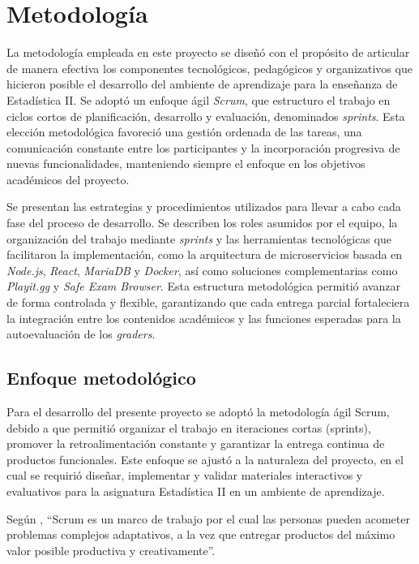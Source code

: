 \documentclass[letter,oneside,12pt,spanish]{report}
\begin{document}
\newpage

\chapter{Metodología}

La metodología empleada en este proyecto se diseñó con el propósito de articular de manera efectiva los componentes tecnológicos, pedagógicos y organizativos que hicieron posible el desarrollo del ambiente de aprendizaje para la enseñanza de Estadística II. Se adoptó un enfoque ágil \textit{Scrum}, que estructuro el trabajo en ciclos cortos de planificación, desarrollo y evaluación, denominados \textit{sprints}. Esta elección metodológica favoreció una gestión ordenada de las tareas, una comunicación constante entre los participantes y la incorporación progresiva de nuevas funcionalidades, manteniendo siempre el enfoque en los objetivos académicos del proyecto.

Se presentan las estrategias y procedimientos utilizados para llevar a cabo cada fase del proceso de desarrollo. Se describen los roles asumidos por el equipo, la organización del trabajo mediante \textit{sprints} y las herramientas tecnológicas que facilitaron la implementación, como la arquitectura de microservicios basada en \textit{Node.js}, \textit{React}, \textit{MariaDB} y \textit{Docker}, así como soluciones complementarias como \textit{Playit.gg} y \textit{Safe Exam Browser}. Esta estructura metodológica permitió avanzar de forma controlada y flexible, garantizando que cada entrega parcial fortaleciera la integración entre los contenidos académicos y las funciones esperadas para la autoevaluación de los \textit{graders}.


\section{Enfoque metodológico}

Para el desarrollo del presente proyecto se adoptó la metodología ágil Scrum, debido a que permitió organizar el trabajo en iteraciones cortas (sprints), promover la retroalimentación constante y garantizar la entrega continua de productos funcionales. Este enfoque se ajustó a la naturaleza del proyecto, en el cual se requirió diseñar, implementar y validar materiales interactivos y evaluativos para la asignatura Estadística II en un ambiente de aprendizaje.

Según \cite{schwaber2013scrum}, ``Scrum es un marco de trabajo por el cual las personas pueden acometer problemas complejos adaptativos, a la vez que entregar productos del máximo valor posible productiva y creativamente''.
\end{document}

